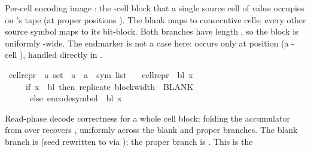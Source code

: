 \begin{isabellebody}
\begin{isamarkuptext}%
Per-cell encoding image : the
  -cell  block that a single
  source cell of value  occupies on 's tape
  (at proper positions ).  The blank
   maps to  consecutive 
  cells; every other source symbol maps to its
   bit-block.  Both branches have length
  , so the block is uniformly -wide.
  The endmarker  is not a case here: 
  occurs only at position  (a -cell
  ), handled directly in
  .%
\end{isamarkuptext}\isamarkuptrue%
\isamarkupfalse%
\ cell{\isacharunderscore}{\kern0pt}repr\ {\isacharcolon}{\kern0pt}{\isacharcolon}{\kern0pt}\ {\isachardoublequoteopen}{\isacharprime}{\kern0pt}a\ set\ {\isasymRightarrow}\ {\isacharprime}{\kern0pt}a\ {\isasymRightarrow}\ {\isacharprime}{\kern0pt}a\ {\isasymRightarrow}\ sym{}\ list{\isachardoublequoteclose}\ \isanewline
\ \ {\isachardoublequoteopen}cell{\isacharunderscore}{\kern0pt}repr\ {\isasymGamma}\ bl\ x\ {\isacharequal}{\kern0pt}\isanewline
\ \ \ \ \ {\isacharparenleft}{\kern0pt}if\ x\ {\isacharequal}{\kern0pt}\ bl\ then\ replicate\ {\isacharparenleft}{\kern0pt}block{\isacharunderscore}{\kern0pt}width\ {\isasymGamma}{\isacharparenright}{\kern0pt}\ BLANK{}\isanewline
\ \ \ \ \ \ else\ encode{\isacharunderscore}{\kern0pt}symbol\ {\isasymGamma}\ bl\ x{\isacharparenright}{\kern0pt}{\isachardoublequoteclose}%
\begin{isamarkuptext}%
Read-phase decode correctness for a whole cell block: folding
  the accumulator from  over  recovers , uniformly across the blank and
  proper branches.  The blank branch is 
  (seed rewritten to  via ); the
  proper branch is .  This is the

\end{isamarkuptext}
\end{isabellebody}
